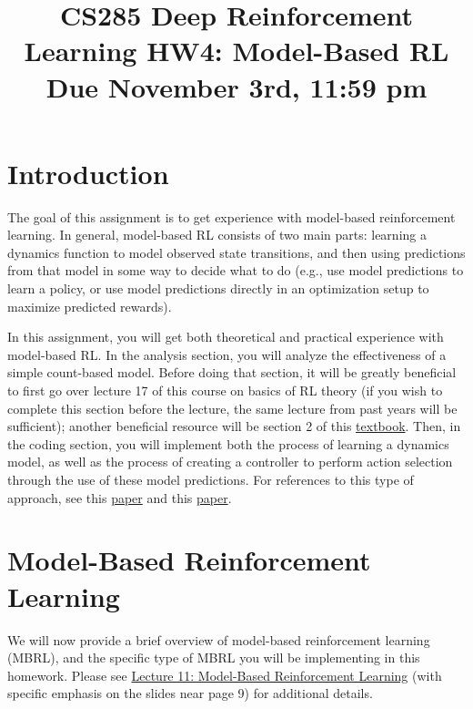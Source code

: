 \documentclass{article} %
\title{CS285 Deep Reinforcement Learning HW4: Model-Based RL\\
\textbf{Due November 3rd, 11:59 pm}}
\author{}
\date{}
\begin{document}
\maketitle


\section{Introduction}

The goal of this assignment is to get experience with model-based reinforcement learning. In general, model-based RL consists of two main parts: learning a dynamics function to model observed state transitions, and then using predictions from that model in some way to decide what to do (e.g., use model predictions to learn a policy, or use model predictions directly in an optimization setup to maximize predicted rewards).

In this assignment, you will get both theoretical and practical experience with model-based RL. In the analysis section, you will analyze the effectiveness of a simple count-based model. Before doing that section, it will be greatly beneficial to first go over lecture 17 of this course on basics of RL theory (if you wish to complete this section before the lecture, the same lecture from past years will be sufficient); another beneficial resource will be section 2 of this \href{https://rltheorybook.github.io/rltheorybook_AJKS.pdf}{textbook}.  
Then, in the coding section, you will implement both the process of learning a dynamics model, as well as the process of creating a controller to perform action selection through the use of these model predictions. For references to this type of approach, see this \href{https://arxiv.org/pdf/1708.02596.pdf}{paper} and this \href{https://arxiv.org/pdf/1909.11652.pdf}{paper}.


\newpage



\newpage

\section{Model-Based Reinforcement Learning}

We will now provide a brief overview of model-based reinforcement learning (MBRL), and the specific type of MBRL you will be implementing in this homework. Please see \href{http://rail.eecs.berkeley.edu/deeprlcourse/static/slides/lec-11.pdf}{Lecture 11: Model-Based Reinforcement Learning} (with specific emphasis on the slides near page 9) for additional details.
\end{document}
